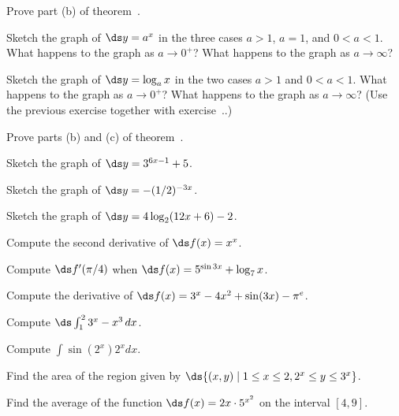 \begin{theorem}
\begin{theorem}
\begin{theorem}
\begin{theorem}
\begin{theorem}
\begin{theorem}
\begin{exercises}

\begin{exercise} Prove part (b) of theorem~.

\begin{exercise} Sketch the graph of $\ds y=a^x $ in the three cases $a>1$,
$a=1$, and $0<a< 1 $. What happens to the graph as $a\to 0^+$?
What happens to the graph as $a\to\infty $?

\begin{exercise} Sketch the graph of $\ds y=\log_a x$ in the two cases $a>1$ and
$0<a< 1 $. What happens to the graph as $a\to 0^+$?  What happens to
the graph as $a\to\infty$? (Use the previous exercise together with
exercise~..)


\begin{exercise} Prove parts (b) and (c) of theorem~.

\begin{exercise} Sketch the graph of $\ds y=3^{6x-1} + 5 $.

\begin{exercise} Sketch the graph of $\ds y= -(1/2)^{-3x}$. 

\begin{exercise} Sketch the graph of $\ds y=4\log_2 (12x + 6)-2$.

\begin{exercise} Compute the second derivative of $\ds f(x)=x^x$.

\begin{exercise} Compute $\ds f'(\pi/4)$ when $\ds f(x)
= 5^{\sin 3x} + \log_7 x$. 

\begin{exercise} Compute the derivative of 
$\ds f(x) = 3^x - 4x^2 + \sin(3x) - \pi^e$. 

\begin{exercise} Compute $\ds \int_1^2 3^x - x^3\,dx$.

\begin{exercise} Compute $\int \sin (2^x ) 2^x dx $.


\begin{exercise} Find the area of the region given by
$\ds \{(x, y) \mid 1 \leq x \leq 2 , 2^x \leq y \leq 3^x\}$.

\begin{exercise} Find the average of the function $\ds f(x)= 2x\cdot 5^{x^2}$
on the interval $[4,9]$.



\end{exercise}
\end{exercise}
\end{exercise}
\end{exercise}
\end{exercise}
\end{exercise}
\end{exercise}
\end{exercise}
\end{exercise}
\end{exercise}
\end{exercise}
\end{exercise}
\end{exercise}
\end{exercise}
\end{exercises}
\end{theorem}
\end{theorem}
\end{theorem}
\end{theorem}
\end{theorem}
\end{theorem}
